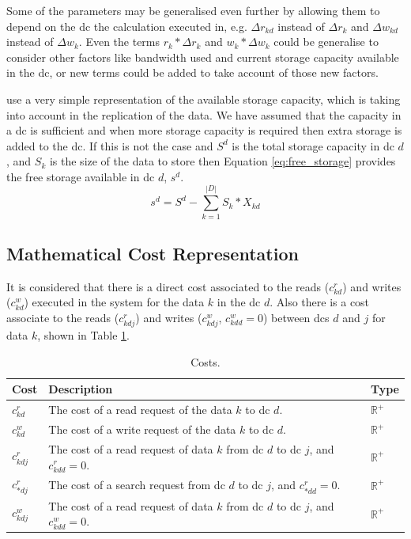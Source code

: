 \documentclass[english]{article}
\begin{document}
Some of the parameters may be generalised even further by allowing them to depend on the \gls{dc} the calculation executed in, e.g. $\Delta r_{kd}$ instead of $\Delta r_{k}$ and $\Delta w_{kd}$ instead of $\Delta w_{k}$. Even the terms $r_{k} * \Delta r_{k}$ and $w_{k} * \Delta w_{k}$ could be generalise to consider other factors like bandwidth used and current storage capacity available in the \gls{dc}, or new terms could be added to take account of those new factors.

\citet{Paiva2013a} use a very simple representation of the available storage capacity, which is taking into account in the replication of the data. We have assumed that the capacity in a \gls{dc} is sufficient and when more storage capacity is required then extra storage is added to the \gls{dc}. If this is not the case and $S^{d}$ is the total storage capacity in \gls{dc} $d$, and $S_{k}$ is the size of the data to store then Equation \ref{eq:free_storage} provides the free storage available in \gls{dc} $d$, $s^{d}$.
\begin{equation} \label{eq:free_storage}
	s^{d} = S^{d} - \sum^{|D|}_{k = 1} S_{k} * X_{kd}
\end{equation}


\subsection{Mathematical Cost Representation} \label{sec:math_cost_representation}
It is considered that there is a direct cost associated to the reads ($c^{r}_{kd}$) and writes ($c^{w}_{kd}$) executed in the system for the data $k$ in the \gls{dc} $d$. Also there is a cost associate to the reads ($c^{r}_{kdj}$) and writes ($c^{w}_{kdj}$, $c^{w}_{kdd} = 0$) between \glspl{dc} $d$ and $j$ for data $k$, shown in Table \ref{tb:costs}.
\begin{table}[ht!]
	\begin{center}
		\begin{tabular}{|l|p{9.2cm}|l|}
			\hline
			Cost & Description & Type \\
			\hline
			\hline
			$c^{r}_{kd}$   & The cost of a read request of the data $k$ to \gls{dc} $d$. & $\mathbb{R}^{+}$ \\
			\hline
			$c^{w}_{kd}$  & The cost of a write request of the data $k$ to \gls{dc} $d$. & $\mathbb{R}^{+}$ \\
			\hline
			$c^{r}_{kdj}$  & The cost of a read request of data $k$ from \gls{dc} $d$ to \gls{dc} $j$, and $c^{r}_{kdd} = 0$. & $\mathbb{R}^{+}$ \\
			\hline
			$c^{r}_{*dj}$  & The cost of a search request from \gls{dc} $d$ to \gls{dc} $j$, and $c^{r}_{*dd} = 0$. & $\mathbb{R}^{+}$ \\
			\hline
			$c^{w}_{kdj}$ & The cost of a read request of data $k$ from \gls{dc} $d$ to \gls{dc} $j$, and $c^{w}_{kdd} = 0$. & $\mathbb{R}^{+}$ \\
			\hline
		\end{tabular}
	\end{center}

	\caption{Costs.}
	\label{tb:costs}
\end{table}
\end{document}
